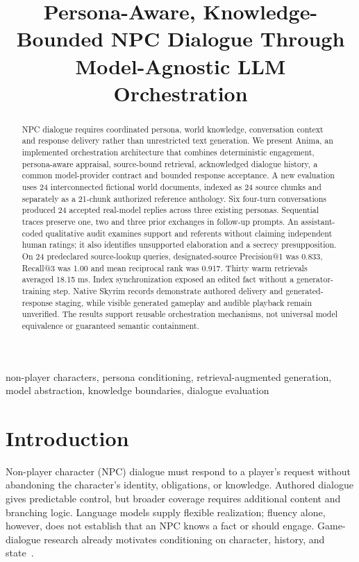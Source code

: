 \documentclass[conference]{IEEEtran}
\begin{document}
\title{Persona-Aware, Knowledge-Bounded NPC Dialogue Through Model-Agnostic LLM Orchestration}
\author{
}
\maketitle
\begin{abstract}
NPC dialogue requires coordinated persona, world knowledge, conversation context and response delivery rather than unrestricted text generation. We present Anima, an implemented orchestration architecture that combines deterministic engagement, persona-aware appraisal, source-bound retrieval, acknowledged dialogue history, a common model-provider contract and bounded response acceptance. A new evaluation uses 24 interconnected fictional world documents, indexed as 24 source chunks and separately as a 21-chunk authorized reference anthology. Six four-turn conversations produced 24 accepted real-model replies across three existing personas. Sequential traces preserve one, two and three prior exchanges in follow-up prompts. An assistant-coded qualitative audit examines support and referents without claiming independent human ratings; it also identifies unsupported elaboration and a secrecy presupposition. On 24 predeclared source-lookup queries, designated-source Precision@1 was 0.833, Recall@3 was 1.00 and mean reciprocal rank was 0.917. Thirty warm retrievals averaged 18.15 ms. Index synchronization exposed an edited fact without a generator-training step. Native Skyrim records demonstrate authored delivery and generated-response staging, while visible generated gameplay and audible playback remain unverified. The results support reusable orchestration mechanisms, not universal model equivalence or guaranteed semantic containment.
\end{abstract}
\begin{IEEEkeywords}
non-player characters, persona conditioning, retrieval-augmented generation, model abstraction, knowledge boundaries, dialogue evaluation
\end{IEEEkeywords}

\section{Introduction}
Non-player character (NPC) dialogue must respond to a player's request without abandoning the character's identity, obligations, or knowledge. Authored dialogue gives predictable control, but broader coverage requires additional content and branching logic. Language models supply flexible realization; fluency alone, however, does not establish that an NPC knows a fact or should engage. Game-dialogue research already motivates conditioning on character, history, and state~\cite{callison2022}.
\end{document}
